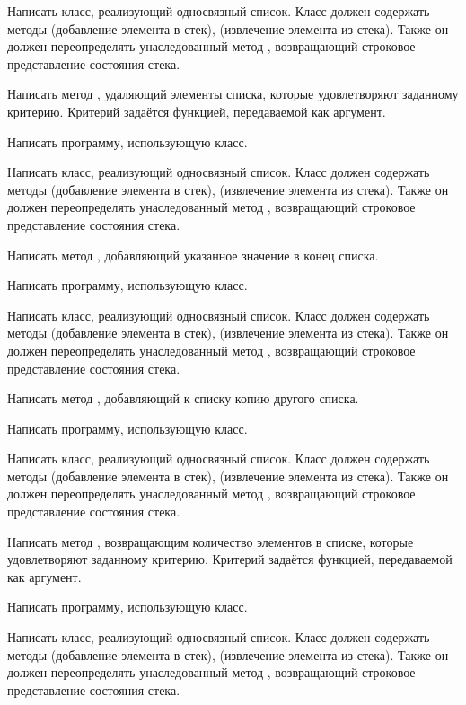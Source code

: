 \task Написать класс, реализующий односвязный список. Класс должен
содержать методы  (добавление элемента в стек), 
(извлечение элемента из стека). Также он должен переопределять
унаследованный метод , возвращающий строковое
представление состояния стека.

Написать метод , удаляющий элементы списка, которые
удовлетворяют заданному критерию. Критерий задаётся функцией,
передаваемой как аргумент. 

Написать программу, использующую класс.

\task Написать класс, реализующий односвязный список. Класс должен
содержать методы  (добавление элемента в стек), 
(извлечение элемента из стека). Также он должен переопределять
унаследованный метод , возвращающий строковое
представление состояния стека.

Написать метод , добавляющий указанное значение в конец
списка.

Написать программу, использующую класс.

\task Написать класс, реализующий односвязный список. Класс должен
содержать методы  (добавление элемента в стек), 
(извлечение элемента из стека). Также он должен переопределять
унаследованный метод , возвращающий строковое
представление состояния стека.

Написать метод , добавляющий к списку копию другого
списка.

Написать программу, использующую класс.

\task Написать класс, реализующий односвязный список. Класс должен
содержать методы  (добавление элемента в стек), 
(извлечение элемента из стека). Также он должен переопределять
унаследованный метод , возвращающий строковое
представление состояния стека.

Написать метод , возвращающим количество элементов в
списке, которые удовлетворяют заданному критерию. Критерий задаётся
функцией, передаваемой как аргумент.

Написать программу, использующую класс.

\task Написать класс, реализующий односвязный список. Класс должен
содержать методы  (добавление элемента в стек), 
(извлечение элемента из стека). Также он должен переопределять
унаследованный метод , возвращающий строковое
представление состояния стека.

